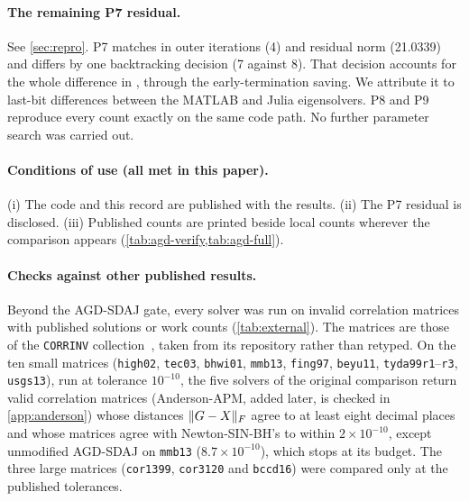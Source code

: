 \paragraph{The remaining P7 residual.}
See \cref{sec:repro}. P7 matches in outer iterations (4) and residual norm
(21.0339) and differs by one backtracking decision (7 against 8). That decision
accounts for the whole difference in \EVDs, through the early-termination
saving. We attribute it to last-bit differences between the MATLAB and Julia
eigensolvers. P8 and P9 reproduce every count exactly on the same code path.
No further parameter search was carried out.

\paragraph{Conditions of use (all met in this paper).}
(i) The code and this record are published with the results. (ii) The P7
residual is disclosed. (iii) Published counts are printed beside local counts
wherever the comparison appears (\cref{tab:agd-verify,tab:agd-full}).

\paragraph{Checks against other published results.}
Beyond the AGD-SDAJ gate, every solver was run on invalid correlation matrices
with published solutions or work counts
(\cref{tab:external}). The matrices are those of the \texttt{CORRINV}
collection~\cite{higham2022anymatrix}, taken from its repository rather than
retyped. On the ten small matrices (\texttt{high02}, \texttt{tec03},
\texttt{bhwi01}, \texttt{mmb13}, \texttt{fing97}, \texttt{beyu11},
\texttt{tyda99r1}--\texttt{r3}, \texttt{usgs13}), run at tolerance $10^{-10}$,
the five solvers of the original comparison return valid correlation
matrices (Anderson-APM, added later, is checked in \cref{app:anderson}) whose
distances
$\lVert G-X\rVert_F$ agree to at least eight decimal places and whose matrices agree
with Newton-SIN-BH's to within $2\times10^{-10}$, except unmodified AGD-SDAJ on
\texttt{mmb13} ($8.7\times10^{-10}$), which stops at its budget. The three
large matrices (\texttt{cor1399}, \texttt{cor3120} and \texttt{bccd16}) were
compared only at the published tolerances.

